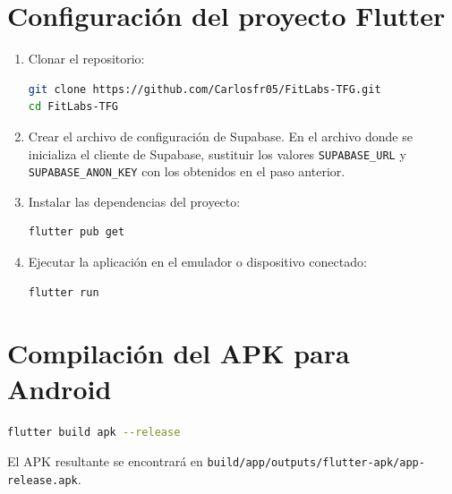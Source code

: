 \section{Configuración del proyecto Flutter}

\begin{enumerate}
  \item Clonar el repositorio:
\begin{lstlisting}[language=bash]
git clone https://github.com/Carlosfr05/FitLabs-TFG.git
cd FitLabs-TFG
\end{lstlisting}
  \item Crear el archivo de configuración de Supabase. En el archivo donde se inicializa el cliente de Supabase, sustituir los valores \texttt{SUPABASE\_URL} y \texttt{SUPABASE\_ANON\_KEY} con los obtenidos en el paso anterior.
  \item Instalar las dependencias del proyecto:
\begin{lstlisting}[language=bash]
flutter pub get
\end{lstlisting}
  \item Ejecutar la aplicación en el emulador o dispositivo conectado:
\begin{lstlisting}[language=bash]
flutter run
\end{lstlisting}
\end{enumerate}

\section{Compilación del APK para Android}

\begin{lstlisting}[language=bash]
flutter build apk --release
\end{lstlisting}

El APK resultante se encontrará en \texttt{build/app/outputs/flutter-apk/app-release.apk}.
